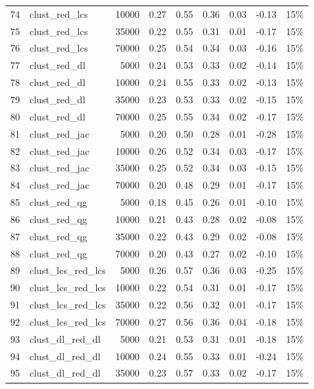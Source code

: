 \documentclass{praca1}
\begin{document}
\begin{table}[!h]
\begin{tabular}{|rlr|rrr|rr|r|}
  74 & clust\_red\_lcs & 10000 & 0.27 & 0.55 & 0.36 & 0.03 & -0.13 & 15\% \\ 
  75 & clust\_red\_lcs & 35000 & 0.22 & 0.55 & 0.31 & 0.01 & -0.17 & 15\% \\ 
  76 & clust\_red\_lcs & 70000 & 0.25 & 0.54 & 0.34 & 0.03 & -0.16 & 15\% \\ 
   \hline
77 & clust\_red\_dl & 5000 & 0.24 & 0.53 & 0.33 & 0.02 & -0.14 & 15\% \\ 
  78 & clust\_red\_dl & 10000 & 0.24 & 0.55 & 0.33 & 0.02 & -0.13 & 15\% \\ 
  79 & clust\_red\_dl & 35000 & 0.23 & 0.53 & 0.33 & 0.02 & -0.15 & 15\% \\ 
  80 & clust\_red\_dl & 70000 & 0.25 & 0.55 & 0.34 & 0.02 & -0.17 & 15\% \\ 
   \hline
81 & clust\_red\_jac & 5000 & 0.20 & 0.50 & 0.28 & 0.01 & -0.28 & 15\% \\ 
  82 & clust\_red\_jac & 10000 & 0.26 & 0.52 & 0.34 & 0.03 & -0.17 & 15\% \\ 
  83 & clust\_red\_jac & 35000 & 0.25 & 0.52 & 0.34 & 0.03 & -0.15 & 15\% \\ 
  84 & clust\_red\_jac & 70000 & 0.20 & 0.48 & 0.29 & 0.01 & -0.17 & 15\% \\ 
   \hline
85 & clust\_red\_qg & 5000 & 0.18 & 0.45 & 0.26 & 0.01 & -0.10 & 15\% \\ 
  86 & clust\_red\_qg & 10000 & 0.21 & 0.43 & 0.28 & 0.02 & -0.08 & 15\% \\ 
  87 & clust\_red\_qg & 35000 & 0.22 & 0.43 & 0.29 & 0.02 & -0.08 & 15\% \\ 
  88 & clust\_red\_qg & 70000 & 0.20 & 0.43 & 0.27 & 0.02 & -0.10 & 15\% \\ 
   \hline
89 & clust\_lcs\_red\_lcs & 5000 & 0.26 & 0.57 & 0.36 & 0.03 & -0.25 & 15\% \\ 
  90 & clust\_lcs\_red\_lcs & 10000 & 0.22 & 0.54 & 0.31 & 0.01 & -0.17 & 15\% \\ 
  91 & clust\_lcs\_red\_lcs & 35000 & 0.22 & 0.56 & 0.32 & 0.01 & -0.17 & 15\% \\ 
  92 & clust\_lcs\_red\_lcs & 70000 & 0.27 & 0.56 & 0.36 & 0.04 & -0.18 & 15\% \\ 
   \hline
93 & clust\_dl\_red\_dl & 5000 & 0.21 & 0.53 & 0.31 & 0.01 & -0.18 & 15\% \\ 
  94 & clust\_dl\_red\_dl & 10000 & 0.24 & 0.55 & 0.33 & 0.01 & -0.24 & 15\% \\ 
  95 & clust\_dl\_red\_dl & 35000 & 0.23 & 0.57 & 0.33 & 0.02 & -0.17 & 15\% \\ 

\end{tabular}
\end{table}
\end{document}

